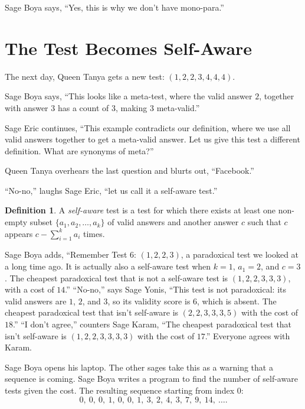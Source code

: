 \documentclass[12pt,reqno]{article}
\theoremstyle{plain}
\theoremstyle{definition}
\newtheorem{definition}{Definition}
\theoremstyle{remark}
\begin{document}
Sage Boya says, ``Yes, this is why we don't have mono-para.''



\section*{The Test Becomes Self-Aware}

The next day, Queen Tanya gets a new test: $(1,2,2,3,4,4,4)$.

Sage Boya says, ``This looks like a meta-test, where the valid answer $2$, together with answer $3$ has a count of $3$, making $3$ meta-valid.''

Sage Eric continues, ``This example contradicts our definition, where we use all valid answers together to get a meta-valid answer. Let us give this test a different definition. What are synonyms of meta?''

Queen Tanya overhears the last question and blurts out, ``Facebook.''

``No-no,'' laughs Sage Eric, ``let us call it a self-aware test.''

\begin{definition}
A \textit{self-aware} test is a test for which there exists at least one non-empty subset $\{a_1,a_2,\dots,a_k\}$ of valid answers and another answer $c$ such that $c$ appears $c-\sum_{i=1}^ka_i$ times.
\end{definition}

Sage Boya adds, ``Remember Test 6: $(1,2,2,3)$, a paradoxical test we looked at a long time ago. It is actually also a self-aware test when $k=1$, $a_1=2$, and $c=3$. The cheapest paradoxical test that is not a self-aware test is $(1,2,2,3,3,3)$, with a cost of $14$.'' ``No-no,'' says Sage Yonis, ``This test is not paradoxical: its valid answers are $1$, $2$, and $3$, so its validity score is $6$, which is absent. The cheapest paradoxical test that isn't self-aware is $(2,2,3,3,3,5)$ with the cost of $18$.'' ``I don't agree,'' counters Sage Karam, ``The cheapest paradoxical test that isn't self-aware is $(1,2,2,3,3,3,3)$ with the cost of $17$.'' Everyone agrees with Karam.

Sage Boya opens his laptop. The other sages take this as a warning that a sequence is coming. Sage Boya writes a program to find the number of self-aware tests given the cost. The resulting sequence starting from index $0$:
\[0,\ 0,\ 0,\ 1,\ 0,\ 0,\ 1,\ 3,\ 2,\ 4,\ 3,\ 7,\ 9,\ 14,\ \dots.\]
\end{document}
